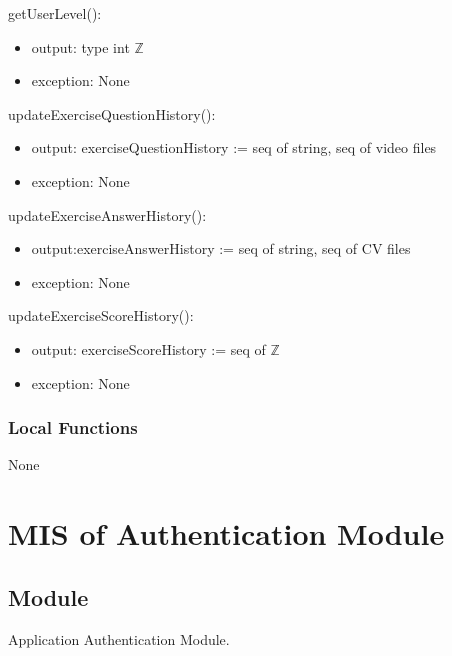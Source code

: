 \documentclass[12pt, titlepage]{article}
\begin{document}
\noindent getUserLevel(): 
\begin{itemize}
\item output: type int $\mathbb{Z}$ 
\item exception: None
\end{itemize}

\noindent updateExerciseQuestionHistory(): 
\begin{itemize}
\item output: exerciseQuestionHistory := seq of string, seq of video files \\
\item exception: None
\end{itemize}

\noindent updateExerciseAnswerHistory(): 
\begin{itemize}
\item output:exerciseAnswerHistory := seq of string, seq of CV files \\
\item exception: None
\end{itemize}

\noindent updateExerciseScoreHistory(): 
\begin{itemize}
\item output: exerciseScoreHistory := seq of $\mathbb{Z}$ \\
\item exception: None
\end{itemize}

\subsubsection{Local Functions}

None


\newpage


\section{MIS of Authentication Module} \label{Module}

\subsection{Module}

Application Authentication Module.
\end{document}
